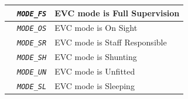 \begin{itemize}
\begin{longtable}{|l|l|l|}
			\hline

			&	\begin{minipage}[t]{0.40\linewidth} \emph{\texttt{MODE\_FS}} \end{minipage}
			&	\begin{minipage}[t]{0.38\linewidth} EVC mode is Full Supervision \end{minipage} \\

			\hline

			&	\begin{minipage}[t]{0.40\linewidth} \emph{\texttt{MODE\_OS}} \end{minipage}
			&	\begin{minipage}[t]{0.38\linewidth} EVC mode is On Sight \end{minipage} \\

			\hline

			&	\begin{minipage}[t]{0.40\linewidth} \emph{\texttt{MODE\_SR}} \end{minipage}
			&	\begin{minipage}[t]{0.38\linewidth} EVC mode is Staff Responsible \end{minipage} \\

			\hline

			&	\begin{minipage}[t]{0.40\linewidth} \emph{\texttt{MODE\_SH}} \end{minipage}
			&	\begin{minipage}[t]{0.38\linewidth} EVC mode is Shunting \end{minipage} \\

			\hline

			&	\begin{minipage}[t]{0.40\linewidth} \emph{\texttt{MODE\_UN}} \end{minipage}
			&	\begin{minipage}[t]{0.38\linewidth} EVC mode is Unfitted \end{minipage} \\

			\hline

			&	\begin{minipage}[t]{0.40\linewidth} \emph{\texttt{MODE\_SL}} \end{minipage}
			&	\begin{minipage}[t]{0.38\linewidth} EVC mode is Sleeping \end{minipage} \\


\end{longtable}
\end{itemize}
